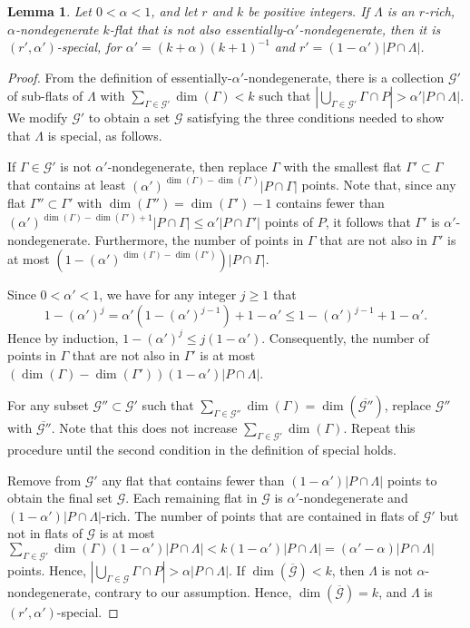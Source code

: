 \documentclass{article}
\newtheorem{lemma}[theorem]{Lemma}
\begin{document}
\begin{lemma}\label{th:specialFlats}
	Let $0 < \alpha < 1$, and let $r$ and $k$ be positive integers.
	If $\Lambda$ is an $r$-rich, $\alpha$-nondegenerate $k$-flat that is not also essentially-$\alpha'$-nondegenerate, then it is $(r',\alpha')$-special, for $\alpha' = (k + \alpha)(k + 1)^{-1}$ and $r'=(1-\alpha')|P \cap \Lambda|$.
\end{lemma}
\begin{proof}
	From the definition of essentially-$\alpha'$-nondegenerate, there is a collection $\mathcal{G}'$ of sub-flats of $\Lambda$ with $\sum_{\Gamma \in \mathcal{G}'} \dim(\Gamma) < k$ such that $|\bigcup_{\Gamma \in \mathcal{G}'} \Gamma \cap P| > \alpha' |P \cap \Lambda|$.
	We modify $\mathcal{G}'$ to obtain a set $\mathcal{G}$ satisfying the three conditions needed to show that $\Lambda$ is special, as follows.
	
	If $\Gamma \in \mathcal{G}'$ is not $\alpha'$-nondegenerate, then replace $\Gamma$ with the smallest flat $\Gamma' \subset \Gamma$ that contains at least $(\alpha')^{\dim(\Gamma) - \dim(\Gamma')}|P \cap \Gamma|$ points.
	Note that, since any flat $\Gamma'' \subset \Gamma'$ with $\dim(\Gamma'') = \dim(\Gamma') - 1$ contains fewer than $(\alpha')^{\dim(\Gamma) - \dim(\Gamma') + 1}|P \cap \Gamma| \leq \alpha'|P \cap \Gamma'|$ points of $P$, it follows that $\Gamma'$ is $\alpha'$-nondegenerate.
	Furthermore, the number of points in $\Gamma$ that are not also in $\Gamma'$ is at most $(1-(\alpha')^{\dim(\Gamma) - \dim(\Gamma')}) |P \cap \Gamma|$.
	
	Since $0 < \alpha' < 1$, we have for any integer $j \geq 1$ that 
	\[1-(\alpha')^j = \alpha'(1 - (\alpha')^{j-1}) + 1 - \alpha' \leq 1 - (\alpha')^{j-1} + 1 - \alpha'.\] 
	Hence by induction, $1 - (\alpha')^j \leq j(1-\alpha')$.
	Consequently, the number of points in $\Gamma$ that are not also in $\Gamma'$ is at most $ (\dim(\Gamma) - \dim(\Gamma'))(1-\alpha')|P \cap \Lambda|$.
	
	For any subset $\mathcal{G}'' \subset \mathcal{G}'$ such that $\sum_{\Gamma \in \mathcal{G''}} \dim(\Gamma) = \dim(\overline{\mathcal{G''}})$, replace $\mathcal{G}''$ with $\overline{\mathcal{G}''}$.
	Note that this does not increase $\sum_{\Gamma \in \mathcal{G'}} \dim(\Gamma)$.
	Repeat this procedure until the second condition in the definition of special holds.
	
	Remove from $\mathcal{G}'$ any flat that contains fewer than $(1-\alpha')|P \cap \Lambda|$ points to obtain the final set $\mathcal{G}$.
	Each remaining flat in $\mathcal{G}$ is $\alpha'$-nondegenerate and $(1-\alpha')|P \cap \Lambda|$-rich.
	The number of points that are contained in flats of $\mathcal{G}'$ but not in flats of $\mathcal{G}$ is at most $\sum_{\Gamma \in \mathcal{G}'} \dim(\Gamma) (1-\alpha')|P \cap \Lambda| < k (1-\alpha') |P \cap \Lambda|= (\alpha'-\alpha)|P \cap \Lambda|$ points.
	Hence, $|\bigcup_{\Gamma \in \mathcal{G}} \Gamma \cap P| > \alpha |P \cap \Lambda|$.
	If $\dim(\overline{\mathcal{G}}) < k$, then $\Lambda$ is not $\alpha$-nondegenerate, contrary to our assumption.
	Hence, $\dim(\overline{\mathcal{G}}) = k$, and $\Lambda$ is $(r',\alpha')$-special.
\end{proof}
\end{document}
